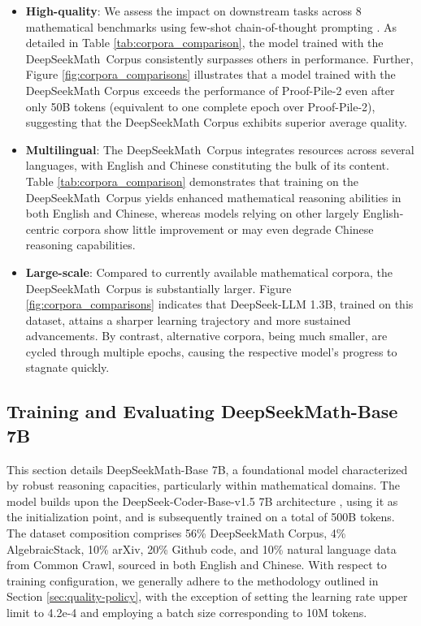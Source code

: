 \begin{itemize}[topsep=0pt]
    \item \textbf{High-quality}:
    We assess the impact on downstream tasks across 8 mathematical benchmarks using few-shot chain-of-thought prompting \cite{cot}. As detailed in Table \ref{tab:corpora_comparison}, the model trained with the DeepSeekMath~Corpus consistently surpasses others in performance. Further, Figure \ref{fig:corpora_comparisons} illustrates that a model trained with the DeepSeekMath Corpus exceeds the performance of Proof-Pile-2 even after only 50B tokens (equivalent to one complete epoch over Proof-Pile-2), suggesting that the DeepSeekMath Corpus exhibits superior average quality.
    \item \textbf{Multilingual}:
    The DeepSeekMath~Corpus integrates resources across several languages, with English and Chinese constituting the bulk of its content. Table \ref{tab:corpora_comparison} demonstrates that training on the DeepSeekMath~Corpus yields enhanced mathematical reasoning abilities in both English and Chinese, whereas models relying on other largely English-centric corpora show little improvement or may even degrade Chinese reasoning capabilities.
    \item \textbf{Large-scale}:
    Compared to currently available mathematical corpora, the DeepSeekMath~Corpus is substantially larger. Figure \ref{fig:corpora_comparisons} indicates that DeepSeek-LLM 1.3B, trained on this dataset, attains a sharper learning trajectory and more sustained advancements. By contrast, alternative corpora, being much smaller, are cycled through multiple epochs, causing the respective model's progress to stagnate quickly.
\end{itemize}

\subsection{Training and Evaluating DeepSeekMath-Base 7B}

This section details DeepSeekMath-Base 7B, a foundational model characterized by robust reasoning capacities, particularly within mathematical domains. The model builds upon the DeepSeek-Coder-Base-v1.5 7B architecture \citep{deepseek-coder}, using it as the initialization point, and is subsequently trained on a total of 500B tokens. The dataset composition comprises 56\% DeepSeekMath Corpus, 4\% AlgebraicStack, 10\% arXiv, 20\% Github code, and 10\% natural language data from Common Crawl, sourced in both English and Chinese. With respect to training configuration, we generally adhere to the methodology outlined in Section \ref{sec:quality-policy}, with the exception of setting the learning rate upper limit to 4.2e-4 and employing a batch size corresponding to 10M tokens.

